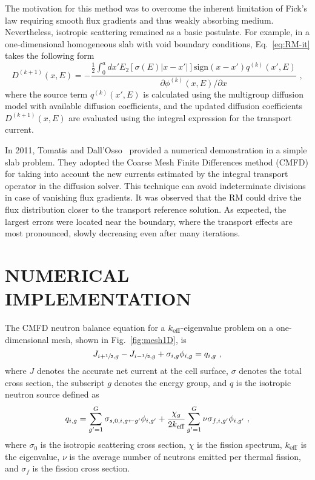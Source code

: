 \documentclass[letterpaper]{physor2020}
\newcommand{\keff}{{\ensuremath{k_{\textrm{\scriptsize{eff}}}}}}
\newcommand{\hzi}{\ensuremath{\sfrac{1}{2}}}
\begin{document}
The motivation for this method was to overcome the inherent limitation of Fick's law requiring smooth flux gradients and thus weakly absorbing medium. Nevertheless, isotropic scattering remained as a basic postulate. For example, in a one-dimensional homogeneous slab with void boundary conditions, Eq.~\eqref{eq:RM-it} takes the following form~\cite{Ronen-2004} 
\begin{equation}\label{eq:RM-it-1D-slab}
D^{(k+1)}(x,E) = -\frac{\frac{1}{2}\int_0^a dx' E_2[\sigma(E)\lvert
	x-x'\rvert]\text{sign}(x-x')q^{(k)}(x',E)}
{\partial \phi^{(k)}(x,E)/\partial x} \,\, ,
\end{equation}
where the source term $q^{(k)}(x',E)$ is calculated using the multigroup diffusion model with available diffusion coefficients, and the updated diffusion coefficients $D^{(k+1)}(x,E)$ are evaluated using the integral expression for the transport current. 

In 2011, Tomatis and Dall'Osso~\cite{Tomatis-2011} provided a numerical demonstration in a simple slab problem. They adopted the Coarse Mesh Finite Differences method (CMFD) for taking into account the new currents estimated by the integral transport operator in the diffusion solver. 
%
%
This technique can avoid indeterminate divisions in case of vanishing flux gradients. It was observed that the RM could drive the flux distribution closer to the transport reference solution. As expected, the largest errors were located near the boundary, where the transport effects are most pronounced, slowly decreasing even after many iterations.%


\section{NUMERICAL IMPLEMENTATION} 
\label{sec:RM-num}

The CMFD neutron balance equation for a $\keff$-eigenvalue problem on a one-dimensional mesh, shown in Fig.~\ref{fig:mesh1D}, is
\begin{equation}\label{eq:balance}
J_{i+\hzi,g} - J_{i-\hzi,g} + \sigma_{i,g} \phi_{i,g} = q_{i,g} \,\, , 
\end{equation}	
where $J$ denotes the accurate net current at the cell surface, $\sigma$ denotes the total cross section, the subscript $g$ denotes the energy group, and $q$ is the isotropic neutron source defined as
\begin{equation}\label{eq:qsrc}
q_{i,g} = \sum\limits_{g'=1}^G\sigma_{s,0,i,g\leftarrow g'}\phi_{i,g'} +
\frac{\chi_g}{2\keff}\sum\limits_{g'=1}^G\nu\sigma_{f,i,g'}\phi_{i,g'} \,\, ,
\end{equation}	
where $\sigma_0$ is the isotropic scattering cross section, $\chi$ is the fission spectrum, $\keff$ is the eigenvalue, $\nu$ is the average number of neutrons emitted per thermal fission, and $\sigma_f$ is the fission cross section.   
\end{document}
